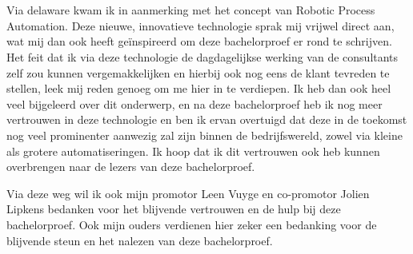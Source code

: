 
\chapter*{}%
\label{ch:voorwoord}



Via delaware kwam ik in aanmerking met het concept van Robotic Process Automation. Deze nieuwe, innovatieve technologie sprak mij vrijwel direct aan, wat mij dan ook heeft geïnspireerd om deze bachelorproef er rond te schrijven.
Het feit dat ik via deze technologie de dagdagelijkse werking van de consultants zelf zou kunnen vergemakkelijken en hierbij ook nog eens de klant tevreden te stellen, leek mij reden genoeg om me hier in te verdiepen.
Ik heb dan ook heel veel bijgeleerd over dit onderwerp, en na deze bachelorproef heb ik nog meer vertrouwen in deze technologie en ben ik ervan overtuigd dat deze in de toekomst nog veel prominenter aanwezig zal zijn binnen de bedrijfswereld, zowel via kleine als grotere automatiseringen.
Ik hoop dat ik dit vertrouwen ook heb kunnen overbrengen naar de lezers van deze bachelorproef.

Via deze weg wil ik ook mijn promotor Leen Vuyge en co-promotor Jolien Lipkens bedanken voor het blijvende vertrouwen en de hulp bij deze bachelorproef.
Ook mijn ouders verdienen hier zeker een bedanking voor de blijvende steun en het nalezen van deze bachelorproef.